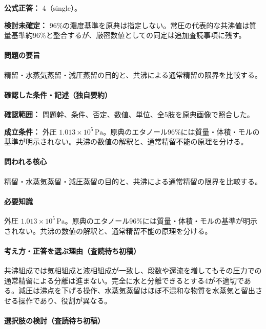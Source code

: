 \textbf{公式正答：} 4（single）。

\par\textbf{検討未確定：} 96\%の濃度基準を原典は指定しない。常圧の代表的な共沸値は質量基準約96\%と整合するが、厳密数値としての同定は追加査読事項に残す。

\paragraph{問題の要旨} 精留・水蒸気蒸留・減圧蒸留の目的と、共沸による通常精留の限界を比較する。

\paragraph{確認した条件・記述（独自要約）}\mbox{}\par

\noindent\textbf{確認範囲：} 問題幹、条件、否定、数値、単位、全5肢を原典画像で照合した。\par

\noindent\textbf{成立条件：} 外圧 \(1.013\times10^5\,\mathrm{Pa}\)。原典のエタノール96\%には質量・体積・モルの基準が明示されない。共沸の数値の解釈と、通常精留不能の原理を分ける。\par

\paragraph{問われる核心} 精留・水蒸気蒸留・減圧蒸留の目的と、共沸による通常精留の限界を比較する。

\paragraph{必要知識} 外圧 \(1.013\times10^5\,\mathrm{Pa}\)。原典のエタノール96\%には質量・体積・モルの基準が明示されない。共沸の数値の解釈と、通常精留不能の原理を分ける。

\paragraph{考え方・正答を選ぶ理由（査読待ち初稿）} 共沸組成では気相組成と液相組成が一致し、段数や還流を増してもその圧力での通常精留による分離は進まない。完全に水と分離できるとする4が不適切である。減圧は沸点を下げる操作、水蒸気蒸留はほぼ不混和な物質を水蒸気と留出させる操作であり、役割が異なる。

\paragraph{選択肢の検討（査読待ち初稿）}\mbox{}\par

